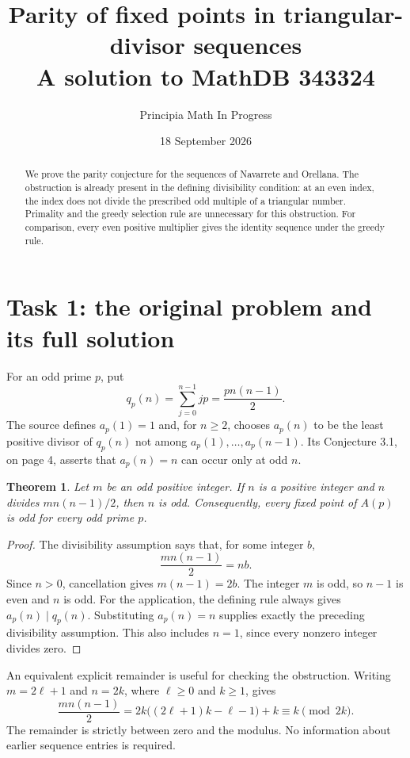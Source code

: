 \documentclass[11pt]{article}
\title{Parity of fixed points in triangular-divisor sequences\\
\large A solution to MathDB 343324}
\author{Principia Math In Progress}
\date{18 September 2026}
\newtheorem{theorem}{Theorem}
\begin{document}
\maketitle
\begin{abstract}
We prove the parity conjecture for the sequences of Navarrete and
Orellana. The obstruction is already present in the defining
divisibility condition: at an even index, the index does not divide
the prescribed odd multiple of a triangular number. Primality and
the greedy selection rule are unnecessary for this obstruction.
For comparison, every even positive multiplier gives the identity
sequence under the greedy rule.
\end{abstract}

\section*{Task 1: the original problem and its full solution}
For an odd prime $p$, put
\[
 q_p(n)=\sum_{j=0}^{n-1}jp=\frac{pn(n-1)}2.
\]
The source \cite{NO} defines $a_p(1)=1$ and, for $n\geq2$,
chooses $a_p(n)$ to be the least positive divisor of $q_p(n)$
not among $a_p(1),\ldots,a_p(n-1)$. Its Conjecture 3.1,
on page 4, asserts that $a_p(n)=n$ can occur only at odd $n$.

\begin{theorem}\label{main}
Let $m$ be an odd positive integer. If $n$ is a positive integer
and $n$ divides $mn(n-1)/2$, then $n$ is odd.
Consequently, every fixed point of $A(p)$ is odd for every
odd prime $p$.
\end{theorem}
\begin{proof}
The divisibility assumption says that, for some integer $b$,
\[
 \frac{mn(n-1)}2=nb.
\]
Since $n>0$, cancellation gives $m(n-1)=2b$.
The integer $m$ is odd, so $n-1$ is even and $n$ is odd.
For the application, the defining rule always gives
$a_p(n)\mid q_p(n)$. Substituting $a_p(n)=n$ supplies exactly
the preceding divisibility assumption. This also includes $n=1$,
since every nonzero integer divides zero.
\end{proof}

An equivalent explicit remainder is useful for checking the
obstruction. Writing $m=2\ell+1$ and $n=2k$, where $\ell\geq0$
and $k\geq1$, gives
\begin{equation}\label{remainder}
 \frac{m n(n-1)}2
 =2k\bigl((2\ell+1)k-\ell-1\bigr)+k
 \equiv k\pmod{2k}.
\end{equation}
The remainder is strictly between zero and the modulus. No
information about earlier sequence entries is required.
\end{document}
